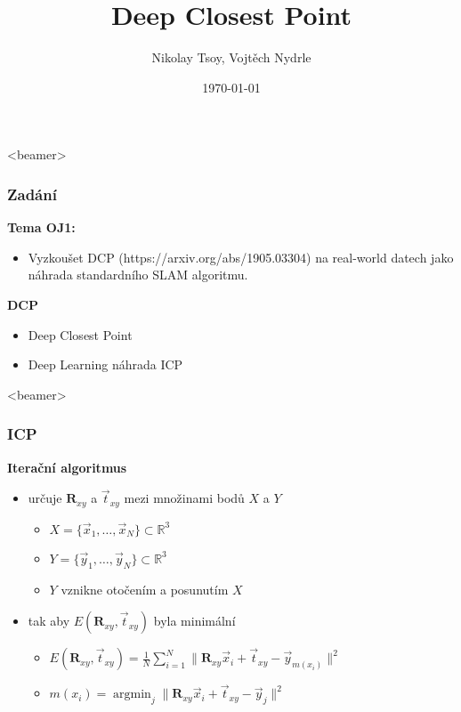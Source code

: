 \documentclass[t]{beamer}
\title{Deep Closest Point}
\author{Nikolay Tsoy, Vojtěch Nydrle}
\date{\today}
\DeclareMathOperator*{\argmin}{argmin}
\newcommand{\norm}[1]{\lVert #1 \rVert}
\begin{document}
\begin{frame}
	\thispagestyle{empty}
  \titlepage
\end{frame}

    
\begin{frame}<beamer>
  \frametitle{Zadání}
	\textbf{Tema OJ1:}
  \begin{itemize}
 \item Vyzkoušet DCP (https://arxiv.org/abs/1905.03304) na real-world datech jako náhrada standardního SLAM algoritmu.
  \end{itemize}
  
  
  \textbf{DCP}
    \begin{itemize}
 \item Deep Closest Point
 \item Deep Learning náhrada ICP
  \end{itemize}  
\end{frame}


\begin{frame}<beamer>
  \frametitle{ICP}
	\textbf{Iterační algoritmus}
  \begin{itemize}
	 \item určuje $\textbf{R}_{xy}$ a $\vec{t}_{xy}$ mezi množinami bodů $X$ a $Y$
	\begin{itemize}
  		 \item $X=\lbrace \vec x_1, \ldots, \vec x_N \rbrace \subset \mathbb{R}^3$
  		\onslide<3-> \item $Y=\lbrace \vec y_1, \ldots, \vec y_N \rbrace \subset \mathbb{R}^3$
  		\onslide<3-> \item $Y$ vznikne otočením a posunutím $X$
  \end{itemize}
  
  
   \item tak aby $E(\textbf{R}_{xy},\vec{t}_{xy})$ byla minimální
	\begin{itemize}
  		 \item $\displaystyle E(\textbf{R}_{xy},\vec{t}_{xy})=\frac{1}{N}\sum_{i=1}^N \norm{\textbf{R}_{xy}\vec x_i+\vec{t}_{xy} -\vec y_{m(x_i)}}^2 $
  		
  		
  		 \item $\displaystyle m(x_i)=\argmin_j \norm{\textbf{R}_{xy}\vec x_i+\vec{t}_{xy} -\vec y_j}^2 $
  \end{itemize}
  \end{itemize}  
\end{frame}
\end{document}
